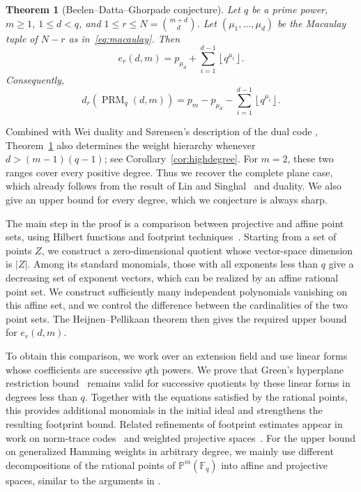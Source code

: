 \documentclass[11pt]{amsart}
\newtheorem{theorem}{Theorem}[section]
\theoremstyle{definition}
\newcommand{\F}{\mathbb F}
\newcommand{\PP}{\mathbb P}
\newcommand{\PRM}{\operatorname{PRM}}
\newcommand{\card}[1]{\left|#1\right|}
\newcommand{\sq}[1]{\left\lfloor q^{#1}\right\rfloor}
\numberwithin{equation}{section}
\begin{document}
\begin{theorem}[Beelen--Datta--Ghorpade conjecture]\label{thm:main}
Let $q$ be a prime power, $m\ge1$, $1\le d<q$, and
$1\le r\le N=\binom{m+d}{d}$. Let $(\mu_1,\ldots,\mu_d)$ be the
Macaulay tuple of $N-r$ as in~\eqref{eq:macaulay}. Then
\begin{equation}\label{eq:mainzeros}
 e_r(d,m)=p_{\mu_d}+\sum_{i=1}^{d-1}\sq{\mu_i}.
\end{equation}
Consequently,
\begin{equation}\label{eq:mainweights}
 d_r(\PRM_q(d,m))
 =p_m-p_{\mu_d}-\sum_{i=1}^{d-1}\sq{\mu_i}.
\end{equation}
\end{theorem}
Combined with Wei duality and S{\o}rensen's description of the dual code \cite{Sorensen},
Theorem~\ref{thm:main} also determines the weight hierarchy whenever
$d>(m-1)(q-1)$; see Corollary~\ref{cor:highdegree}.
For $m=2$, these two ranges cover every positive degree. Thus we recover
the complete plane case, which already follows from the result of
Lin and Singhal~\cite[Thm.~1.5]{LinSinghal2025} and duality. We also give an upper bound for every degree, which we conjecture is always sharp. 

The main step in the proof is a comparison between projective
and affine point sets, using Hilbert functions and footprint
techniques~\cite{geilbezout,BDG19footprint}. Starting from a
set of points $Z$, we construct a zero-dimensional
quotient whose vector-space dimension is $\card Z$.
Among its standard monomials, those with all exponents less than
$q$ give a decreasing set of exponent vectors, which can be
realized by an affine rational point set.
We construct sufficiently many independent polynomials vanishing
on this affine set, and we control the difference between the
cardinalities of the two point sets. The Heijnen--Pellikaan theorem then gives the
required upper bound for $e_r(d,m)$.

To obtain this comparison, we work over an extension
field and use linear forms whose coefficients are successive
$q$th powers. We prove that Green's hyperplane restriction bound~\cite{Green,Caviglia}
remains valid for successive quotients by these linear forms
in degrees less than $q$.
Together with the equations satisfied by the rational points,
this provides additional monomials in the initial ideal and
strengthens the resulting footprint bound. 
Related refinements of footprint estimates appear in work on
norm-trace codes~\cite{sanjoseGHWNT,geilbezout} and weighted projective
spaces~\cite{sanjose_conjecture}. For the upper bound on generalized Hamming weights in arbitrary degree, we mainly use different decompositions of the rational points of $\PP^m(\F_q)$ into affine and projective spaces, similar to the arguments in \cite{SanJose,sanjose_recursive_WPRM}.
\end{document}
